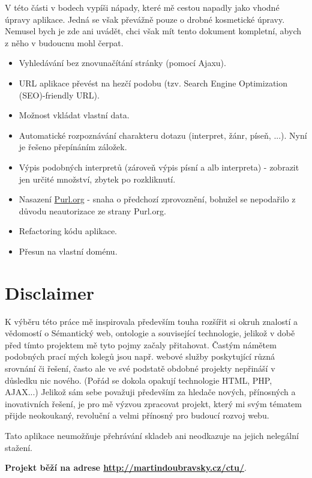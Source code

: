 V této části v bodech vypíši nápady, které mě cestou napadly jako vhodné úpravy aplikace. Jedná se však převážně pouze o drobné kosmetické úpravy. Nemusel bych je zde ani uvádět, chci však mít tento dokument kompletní, abych z něho v budoucnu mohl čerpat.

\begin{itemize}
\item Vyhledávání bez znovunačítání stránky (pomocí Ajaxu).
\item URL aplikace převést na hezčí podobu (tzv. Search Engine Optimization (SEO)-friendly URL).
\item Možnost vkládat vlastní data.
\item Automatické rozpoznávání charakteru dotazu (interpret, žánr, píseň, ...). Nyní je řešeno přepínáním záložek.
\item Výpis podobných interpretů (zároveň výpis písní a alb interpreta) - zobrazit jen určité množství, zbytek po rozkliknutí.
\item Nasazení \url{Purl.org} - snaha o předchozí zprovoznění, bohužel se nepodařilo z důvodu neautorizace ze strany Purl.org.
\item Refactoring kódu aplikace.
\item Přesun na vlastní doménu.
\end{itemize}

      
      
\section{Disclaimer}
K výběru této práce mě inspirovala především touha rozšířit si okruh znalostí a vědomostí o Sémantický web, ontologie a související technologie, jelikož v době před tímto projektem mě tyto pojmy začaly přitahovat. 
Častým námětem podobných prací mých kolegů jsou např. webové služby poskytující různá srovnání či řešení, často ale ve své podstatě obdobné projekty nepřináší v důsledku nic nového. (Pořád se dokola opakují technologie HTML, PHP, AJAX...) 
Jelikož sám sebe považuji především za hledače nových, přínosných a inovativních řešení, je pro mě výzvou zpracovat projekt, který mi svým tématem přijde neokoukaný, revoluční a velmi přínosný pro budoucí rozvoj webu.

\vspace*{24pt}

Tato aplikace neumožňuje přehrávání skladeb ani neodkazuje na jejich nelegální stažení.

\vspace*{24pt}

\textbf{Projekt běží na adrese \url{http://martindoubravsky.cz/ctu/}}.
      